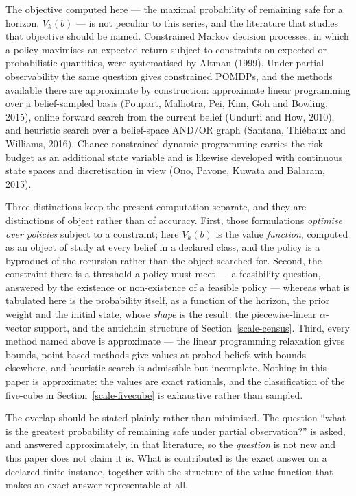 \documentclass[10pt,twocolumn]{article}
\theoremstyle{plain}
\theoremstyle{definition}
\theoremstyle{remark}
\begin{document}
The objective computed here --- the maximal probability of remaining safe for a horizon,
\(V_k(b)\) --- is not peculiar to this series, and the literature that studies that
objective should be named. Constrained Markov decision processes, in which a policy
maximises an expected return subject to constraints on expected or probabilistic
quantities, were systematised by Altman (1999). Under partial observability the same
question gives constrained POMDPs, and the methods available there are approximate by
construction: approximate linear programming over a belief-sampled basis (Poupart,
Malhotra, Pei, Kim, Goh and Bowling, 2015), online forward search from the current belief
(Undurti and How, 2010), and heuristic search over a belief-space AND/OR graph (Santana,
Thi\'ebaux and Williams, 2016). Chance-constrained dynamic programming carries the risk
budget as an additional state variable and is likewise developed with continuous state
spaces and discretisation in view (Ono, Pavone, Kuwata and Balaram, 2015).

Three distinctions keep the present computation separate, and they are distinctions of
object rather than of accuracy. First, those formulations \emph{optimise over policies}
subject to a constraint; here \(V_k(b)\) is the value \emph{function}, computed as an
object of study at every belief in a declared class, and the policy is a byproduct of the
recursion rather than the object searched for. Second, the constraint there is a threshold
a policy must meet --- a feasibility question, answered by the existence or non-existence
of a feasible policy --- whereas what is tabulated here is the probability itself, as a
function of the horizon, the prior weight and the initial state, whose \emph{shape} is the
result: the piecewise-linear \(\alpha\)-vector support, and the antichain structure of
Section~\ref{scale-census}. Third, every method named above is approximate --- the linear
programming relaxation gives bounds, point-based methods give values at probed beliefs
with bounds elsewhere, and heuristic search is admissible but incomplete. Nothing in this
paper is approximate: the values are exact rationals, and the classification of the
five-cube in Section~\ref{scale-fivecube} is exhaustive rather than sampled.

The overlap should be stated plainly rather than minimised. The question ``what is the
greatest probability of remaining safe under partial observation?'' is asked, and answered
approximately, in that literature, so the \emph{question} is not new and this paper does
not claim it is. What is contributed is the exact answer on a declared finite instance,
together with the structure of the value function that makes an exact answer representable
at all.
\end{document}
